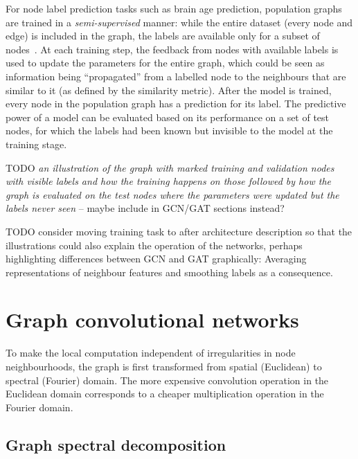 
For node label prediction tasks such as brain age prediction, population graphs are trained in a \textit{semi-supervised} manner: while the entire dataset (every node and edge) is included in the graph, the labels are available only for a subset of nodes~\cite{kipf2017semi}. At each training step, the feedback from nodes with available labels is used to update the parameters for the entire graph, which could be seen as information being ``propagated'' from a labelled node to the neighbours that are similar to it (as defined by the similarity metric). After the model is trained, every node in the population graph has a prediction for its label. The predictive power of a model can be evaluated based on its performance on a set of test nodes, for which the labels had been known but invisible to the model at the training stage.


TODO \textit{an illustration of the graph with marked training and validation nodes with visible labels and how the training happens on those followed by how the graph is evaluated on the test nodes where the parameters were updated but the labels never seen} – maybe include in GCN/GAT sections instead?

TODO consider moving training task to after architecture description so that the illustrations could also explain the operation of the networks, perhaps highlighting differences between GCN and GAT graphically: Averaging representations of neighbour features and smoothing labels as a consequence.~\cite{wu2019simplifying}


\section{Graph convolutional networks}
\label{training-gcn}

To make the local computation independent of irregularities in node neighbourhoods, the graph is first transformed from spatial (Euclidean) to spectral (Fourier) domain. The more expensive convolution operation in the Euclidean domain corresponds to a cheaper multiplication operation in the Fourier domain.

\subsection{Graph spectral decomposition}

